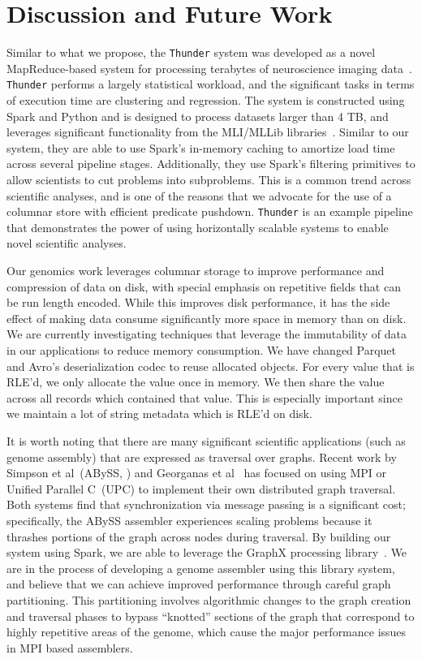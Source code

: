 \documentclass{acm_proc_article-sp}
\begin{document}
\section{Discussion and Future Work}
\label{sec:discussion-future-work}

Similar to what we propose, the \texttt{Thunder} system was developed as a novel MapReduce-based system for
processing terabytes of neuroscience imaging data~\cite{freeman14}. \texttt{Thunder} performs a largely statistical
workload, and the significant tasks in terms of execution time are clustering and regression. The system is
constructed using Spark and Python and is designed to process datasets larger than 4 TB, and leverages
significant functionality from the MLI/MLLib libraries~\cite{sparks13}. Similar to our system, they are able to use
Spark's in-memory caching to amortize load time across several pipeline stages. Additionally, they use Spark's
filtering primitives to allow scientists to cut problems into subproblems. This is a common trend across scientific
analyses, and is one of the reasons that we advocate for the use of a columnar store with efficient predicate
pushdown. \texttt{Thunder} is an example pipeline that demonstrates the power of using horizontally scalable
systems to enable novel scientific analyses.

Our genomics work leverages columnar storage to improve performance and compression of data on disk,
with special emphasis on repetitive fields that can be run length encoded. While this improves
disk performance, it has the side effect of making data consume significantly more space in memory
than on disk. We are currently investigating techniques that leverage the immutability of data in our
applications to reduce memory consumption. We have changed Parquet and Avro's deserialization codec
to reuse allocated objects. For every value that is RLE'd, we only allocate the value once in memory. We
then share the value across all records which contained that value. This is especially important since we
maintain a lot of string metadata which is RLE'd on disk.

It is worth noting that there are many significant scientific applications (such as genome
assembly) that are expressed as traversal over graphs. Recent work by Simpson et al~(ABySS,
\cite{simpson09}) and Georganas et al~\cite{georganas14} has focused on using MPI
or Unified Parallel C~(UPC) to implement their own distributed graph traversal. Both systems
find that synchronization via message passing is a significant cost; specifically, the ABySS assembler
experiences scaling problems because it thrashes portions of the graph across nodes during traversal.
By building our system using Spark, we are able to leverage the GraphX processing library~\cite{gonzalez14,
xin13}. We are in the process of developing a genome assembler using this library system, and
believe that we can achieve improved performance through careful graph partitioning. This partitioning involves
algorithmic changes to the graph creation and traversal phases to bypass ``knotted'' sections of the
graph that correspond to highly repetitive areas of the genome, which cause the major performance
issues in MPI based assemblers.
\end{document}
